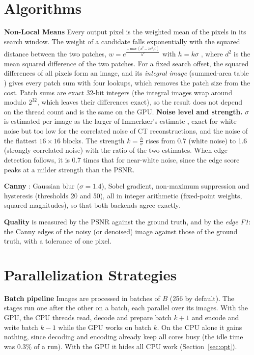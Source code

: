 \documentclass[10pt,a4paper]{article}
\begin{document}
\section{Algorithms}
\textbf{Non-Local Means} Every output pixel is the weighted mean of the pixels in its search window. The weight of a candidate falls
exponentially with the squared distance between the two patches, $w=e^{\frac{-\max(d^2 - 2\sigma^2, 0)}{h^2}}$ with $h=k\sigma$ \cite{buades11}, where $d^2$ is the mean squared difference of the two patches.
For a fixed search offset, the squared differences of all pixels form an image, and its \emph{integral image} (summed-area table
\cite{crow84,darbon08}) gives every patch sum with four lookups, which removes the patch size from the cost. Patch sums are exact 32-bit
integers (the integral images wrap around modulo $2^{32}$, which leaves their differences exact), so the result does not depend on the thread count and is the same on the GPU. \textbf{Noise level and strength.} $\sigma$ is
estimated per image as the larger of Immerk{\ae}r's estimate \cite{immerkaer96}, exact for white noise but too low for the correlated
noise of CT reconstructions, and the noise of the flattest $16\times16$ blocks. The strength $k=\frac{h}{\sigma}$ rises from 0.7 (white noise)
to 1.6 (strongly correlated noise) with the ratio of the two estimates. When edge detection follows, it is 0.7 times that for near-white
noise, since the edge score peaks at a milder strength than the PSNR.

\textbf{Canny} \cite{canny86}: Gaussian blur ($\sigma=1.4$), Sobel gradient, non-maximum suppression and hysteresis (thresholds 20 and
50), all in integer arithmetic (fixed-point weights, squared magnitudes), so that both backends agree exactly.

\textbf{Quality} is measured by the PSNR against the ground truth, and by the \emph{edge F1}: the Canny edges of the noisy (or denoised)
image against those of the ground truth, with a tolerance of one pixel.

\section{Parallelization Strategies}
\textbf{Batch pipeline} Images are processed in batches of $B$ (256 by default). The stages run one after the other on a batch, each
parallel over its images. With the GPU, the CPU threads read, decode and prepare batch $k{+}1$ and encode and write batch $k{-}1$
while the GPU works on batch $k$. On the CPU alone it gains nothing, since decoding and encoding already keep all cores busy (the
idle time was 0.3\% of a run). With the GPU it hides all CPU work (Section~\ref{sec:opt}).
\end{document}
